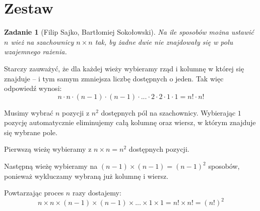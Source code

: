 \documentclass{mwart}
\newtheorem{zad}{Zadanie}[section]
\begin{document}
\newpage
\section{Zestaw}          %

\begin{zad}[Filip Sajko, Bartłomiej Sokołowski]
    Na ile sposobów można ustawić $n$ wież na szachownicy
    $n \times n$ tak, by żadne dwie nie znajdowały się w
    polu wzajemnego rażenia.
\end{zad}
\begin{mdframed}
    Starczy zauważyć, że dla każdej wieży wybieramy rząd i kolumnę
    w której się znajduje -- i tym samym zmniejsza liczbę dostępnych
    o jeden. Tak więc odpowiedź wynosi: \[n \cdot n \cdot (n-1) \cdot
        (n-1) \cdot ... \cdot 2 \cdot 2 \cdot 1 \cdot 1 =  n! \cdot n!\]
\end{mdframed}
\begin{mdframed}
    Musimy wybrać $n$ pozycji z $n^2$ dostępnych pól na szachownicy. Wybierając
    $1$ pozycję automatycznie eliminujemy całą kolumnę oraz wiersz, w którym znajduje się wybrane pole.
    \item Pierwszą wieżę wybieramy z $n \times n = n^2$ dostępnych pozycji.
    \item Następną wieżę wybieramy na $(n-1) \times (n-1) = (n-1)^2$ sposobów, ponieważ wykluczamy wybraną już kolumnę i wiersz.
    \item Powtarzając proces $n$ razy dostajemy:
    \[n \times n \times (n-1) \times (n - 1) \times ... \times 1 \times 1 = n! \times n! = (n!)^2\]
\end{mdframed}
\end{document}
